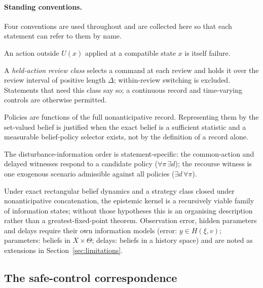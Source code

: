 \paragraph{Standing conventions.} Four conventions are used throughout and are collected here so that each statement can refer to them by name.
\begin{description}[leftmargin=1.6em,itemsep=1pt]
\item[\hyp{Fail}] An action outside $U(x)$ applied at a compatible state $x$ is itself failure.
\item[\hyp{Hold}] A \emph{held-action review class} selects a command at each review and holds it over the review interval of positive length $\Delta$; within-review switching is excluded. Statements that need this class say so; a continuous record and time-varying controls are otherwise permitted.
\item[\hyp{Record}] Policies are functions of the full nonanticipative record. Representing them by the set-valued belief is justified when the exact belief is a sufficient statistic and a measurable belief-policy selector exists, not by the definition of a record alone.
\item[\hyp{Order}] The disturbance-information order is statement-specific: the common-action and delayed witnesses respond to a candidate policy ($\forall\pi\,\exists d$); the recourse witness is one exogenous scenario admissible against all policies ($\exists d\,\forall\pi$).
\end{description}
Under exact rectangular belief dynamics and a strategy class closed under nonanticipative concatenation, the epistemic kernel is a recursively viable family of information states; without those hypotheses this is an organising description rather than a greatest-fixed-point theorem. Observation error, hidden parameters and delays require their own information models (error: $y\in H(\xi,v)$; parameters: beliefs in $X\times\Theta$; delays: beliefs in a history space) and are noted as extensions in Section~\ref{sec:limitations}.

\subsection{The safe-control correspondence}\label{sec:safecontrol}

